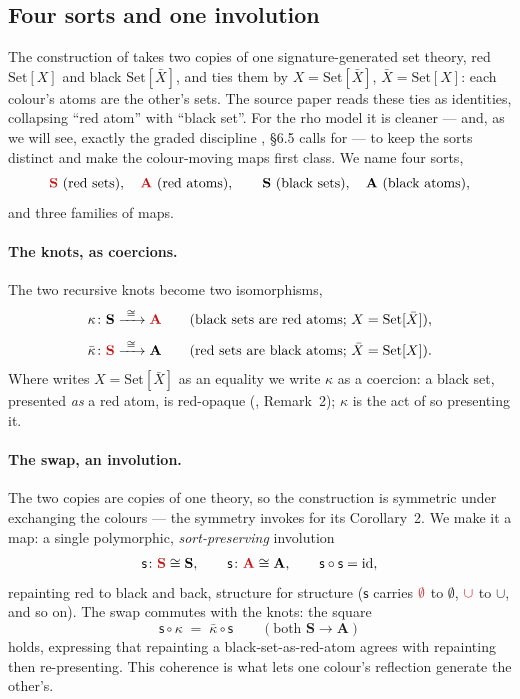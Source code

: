 \documentclass[11pt]{article}
\newcommand{\rd}[1]{\textcolor{redcopy}{#1}}
\newcommand{\RS}{\rd{\mathbf{S}}}              %
\newcommand{\RA}{\rd{\mathbf{A}}}              %
\newcommand{\BS}{\mathbf{S}}                   %
\newcommand{\BA}{\mathbf{A}}                   %
\newcommand{\swp}{\mathsf{s}}                  %
\newcommand{\kt}{\kappa}                       %
\newcommand{\ktb}{\bar\kappa}                  %
\newcommand{\Set}{\mathrm{Set}}
\theoremstyle{plain}
\theoremstyle{definition}
\begin{document}
\subsection{Four sorts and one involution}
The construction of \cite{knot} takes two copies of one signature-generated set
theory, red $\Set[X]$ and black $\Set[\bar X]$, and ties them by
$X=\Set[\bar X]$, $\bar X=\Set[X]$: each colour's atoms are the other's sets. The
source paper reads these ties as identities, collapsing ``red atom'' with ``black
set''. For the rho model it is cleaner --- and, as we will see, exactly the graded
discipline \cite{knot}, \S6.5 calls for --- to keep the sorts distinct and make
the colour-moving maps first class. We name four sorts,
\[
  \RS\ \text{(red sets)},\quad \RA\ \text{(red atoms)},\qquad
  \BS\ \text{(black sets)},\quad \BA\ \text{(black atoms)},
\]
and three families of maps.

\paragraph{The knots, as coercions.} The two recursive knots become two
isomorphisms,
\[
  \kt \colon \BS \xrightarrow{\ \cong\ } \RA
  \qquad(\text{black sets are red atoms; } X=\Set[\bar X]),
\]
\[
  \ktb \colon \RS \xrightarrow{\ \cong\ } \BA
  \qquad(\text{red sets are black atoms; } \bar X=\Set[X]).
\]
Where \cite{knot} writes $X=\Set[\bar X]$ as an equality we write $\kt$ as a
coercion: a black set, presented \emph{as} a red atom, is red-opaque
(\cite{knot}, Remark~2); $\kt$ is the act of so presenting it.

\paragraph{The swap, an involution.} The two copies are copies of one theory, so
the construction is symmetric under exchanging the colours --- the symmetry
\cite{knot} invokes for its Corollary~2. We make it a map: a single polymorphic,
\emph{sort-preserving} involution
\[
  \swp \colon \RS\cong\BS,\qquad \swp\colon\RA\cong\BA,
  \qquad \swp\circ\swp=\mathrm{id},
\]
repainting red to black and back, structure for structure ($\swp$ carries
$\rd\emptyset$ to $\emptyset$, $\rd\cup$ to $\cup$, and so on). The swap commutes
with the knots: the square
\[
  \swp\circ\kt \;=\; \ktb\circ\swp
  \qquad(\text{both } \BS \to \BA)
\]
holds, expressing that repainting a black-set-as-red-atom agrees with repainting
then re-presenting. This coherence is what lets one colour's reflection generate
the other's.
\end{document}
